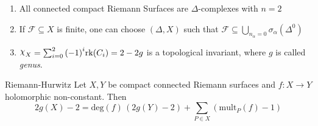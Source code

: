 \begin{theorem}{}
\begin{enumerate}[label = \arabic*)]
    \item All connected compact Riemann Surfaces are \(\Delta\)-complexes with \(n=2\) 
    \item If \(\mathcal{F} \subseteq X \) is finite, one can choose \({(\Delta, X)}\) such
        that \(\mathcal{F} \subseteq \bigcup_{n_{\alpha} = 0} \sigma_{\alpha}
        {\left( \Delta^{0} \right)}  \) 
    \item \(\rchi_X = \sum_{i=0}^{2} {(-1)}^{i} \mathrm{rk}{(C_{i})} = 2 - 2g \)
        is a topological invariant, where \(g\) is called \emph{genus}.
\end{enumerate}
\end{theorem}

\begin{theorem}{Riemann-Hurwitz}\label{thm:RH}
    Let \(X, Y\) be compact connected Riemann surfaces and \(f : X \to Y\) holomorphic
    non-constant. Then
    \[
      2g{(X)} - 2 = \mathrm{deg}{(f)} \, {(2 g{(Y)} - 2)} + \sum_{P \in X}
      {\left( \mathrm{mult}_P{(f)} - 1 \right)} 
    \]
\end{theorem}
